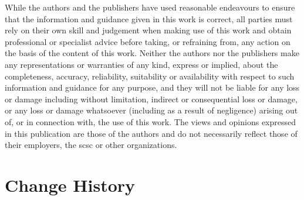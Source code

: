 While the authors and the publishers have used reasonable endeavours to ensure that the information and guidance given in this work is correct, all parties must rely on their own skill and judgement when making use of this work and obtain professional or specialist advice before taking, or refraining from, any action on the basis of the content of this work. Neither the authors nor the publishers make any representations or warranties of any kind, express or implied, about the completeness, accuracy, reliability, suitability or availability with respect to such information and guidance for any purpose, and they will not be liable for any loss or damage including without limitation, indirect or consequential loss or damage, or any loss or damage whatsoever (including as a result of negligence) arising out of, or in connection with, the use of this work. The views and opinions expressed in this publication are those of the authors and do not necessarily reflect those of their employers, the \gls{scsc} or other organizations.

\thispagestyle{empty}%
\clearpage
\maketitle
\thispagestyle{empty}%

\clearpage
\section*{Change History}
\thispagestyle{empty}%

\addtocounter{table}{-1}%
  
